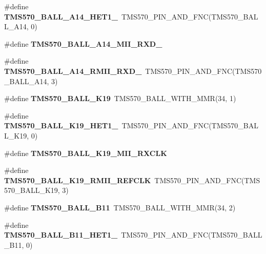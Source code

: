 \begin{DoxyCompactItemize}
\#define {\bfseries T\+M\+S570\+\_\+\+B\+A\+L\+L\+\_\+\+A14\+\_\+\+H\+E\+T1\+\_}~T\+M\+S570\+\_\+\+P\+I\+N\+\_\+\+A\+N\+D\+\_\+\+F\+NC(T\+M\+S570\+\_\+\+B\+A\+L\+L\+\_\+\+A14, 0)
\item 
\#define {\bfseries T\+M\+S570\+\_\+\+B\+A\+L\+L\+\_\+\+A14\+\_\+\+M\+I\+I\+\_\+\+R\+X\+D\+\_}
\item 
\mbox{\label{tms570lc4357-pins_8h_a999276c5faa638e0d2fc3cdb66fcb2c4}} 
\#define {\bfseries T\+M\+S570\+\_\+\+B\+A\+L\+L\+\_\+\+A14\+\_\+\+R\+M\+I\+I\+\_\+\+R\+X\+D\+\_}~T\+M\+S570\+\_\+\+P\+I\+N\+\_\+\+A\+N\+D\+\_\+\+F\+NC(T\+M\+S570\+\_\+\+B\+A\+L\+L\+\_\+\+A14, 3)
\item 
\mbox{\label{tms570lc4357-pins_8h_a28f8110f42019c9898b084e188e64c3a}} 
\#define {\bfseries T\+M\+S570\+\_\+\+B\+A\+L\+L\+\_\+\+K19}~T\+M\+S570\+\_\+\+B\+A\+L\+L\+\_\+\+W\+I\+T\+H\+\_\+\+M\+MR(34, 1)
\item 
\mbox{\label{tms570lc4357-pins_8h_a64a0ef700cc79c978b7be85f8e07ae39}} 
\#define {\bfseries T\+M\+S570\+\_\+\+B\+A\+L\+L\+\_\+\+K19\+\_\+\+H\+E\+T1\+\_}~T\+M\+S570\+\_\+\+P\+I\+N\+\_\+\+A\+N\+D\+\_\+\+F\+NC(T\+M\+S570\+\_\+\+B\+A\+L\+L\+\_\+\+K19, 0)
\item 
\#define {\bfseries T\+M\+S570\+\_\+\+B\+A\+L\+L\+\_\+\+K19\+\_\+\+M\+I\+I\+\_\+\+R\+X\+C\+LK}
\item 
\mbox{\label{tms570lc4357-pins_8h_a5ace6f9b6c95502bc939ea0cf15f9a8f}} 
\#define {\bfseries T\+M\+S570\+\_\+\+B\+A\+L\+L\+\_\+\+K19\+\_\+\+R\+M\+I\+I\+\_\+\+R\+E\+F\+C\+LK}~T\+M\+S570\+\_\+\+P\+I\+N\+\_\+\+A\+N\+D\+\_\+\+F\+NC(T\+M\+S570\+\_\+\+B\+A\+L\+L\+\_\+\+K19, 3)
\item 
\mbox{\label{tms570lc4357-pins_8h_ae5cd5f3965443cbf2e7e7d7e1debe500}} 
\#define {\bfseries T\+M\+S570\+\_\+\+B\+A\+L\+L\+\_\+\+B11}~T\+M\+S570\+\_\+\+B\+A\+L\+L\+\_\+\+W\+I\+T\+H\+\_\+\+M\+MR(34, 2)
\item 
\mbox{\label{tms570lc4357-pins_8h_a4dce69323718b4c53b8ee4b7390d095c}} 
\#define {\bfseries T\+M\+S570\+\_\+\+B\+A\+L\+L\+\_\+\+B11\+\_\+\+H\+E\+T1\+\_}~T\+M\+S570\+\_\+\+P\+I\+N\+\_\+\+A\+N\+D\+\_\+\+F\+NC(T\+M\+S570\+\_\+\+B\+A\+L\+L\+\_\+\+B11, 0)

\end{DoxyCompactItemize}

